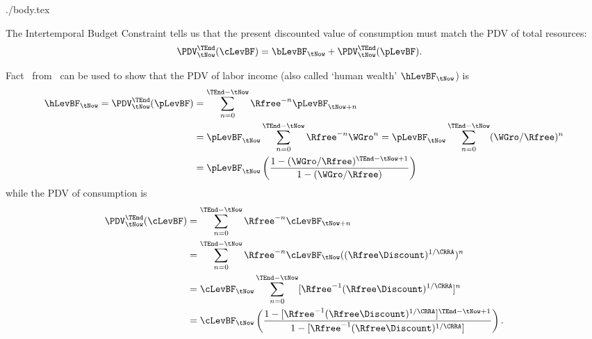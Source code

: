 \documentclass{handout}
\begin{document}
\begin{verbatimwrite}{./body.tex}

The Intertemporal Budget Constraint tells us that the present discounted 
value of consumption must match the PDV of total resources:
\begin{equation}\begin{gathered}\begin{aligned}
        \PDV_{\tNow}^{\TEnd}(\cLevBF) & =  \bLevBF_{\tNow}+\PDV_{\tNow}^{\TEnd}(\pLevBF).
        \label{eq:ibc}
\end{aligned}\end{gathered}\end{equation}

Fact \FinSum~from \MathFactsList~can be used to show that the PDV of labor income (also called `human wealth'
$\hLevBF_{\tNow}$) is
\begin{equation}\begin{gathered}\begin{aligned}
        \hLevBF_{\tNow} = \PDV_{\tNow}^{\TEnd}(\pLevBF) & =  \sum_{n=0}^{\TEnd-\tNow} \Rfree^{-n}\pLevBF_{\tNow+n}
\\       & =  \pLevBF_{\tNow}\sum_{n=0}^{\TEnd-\tNow} \Rfree^{-n}{\WGro}^{n} = \pLevBF_{\tNow}\sum_{n=0}^{\TEnd-\tNow} ({\WGro}/\Rfree)^{n}
\\   & =  \pLevBF_{\tNow}\left(\frac{1-({\WGro}/\Rfree)^{\TEnd-\tNow+1}}{1-({\WGro}/\Rfree)}\right)    \label{eq:yfin}
\end{aligned}\end{gathered}\end{equation}
while the PDV of consumption is
\begin{equation}\begin{gathered}\begin{aligned}
        \PDV_{\tNow}^{\TEnd}(\cLevBF) & =  \sum_{n=0}^{\TEnd-\tNow} \Rfree^{-n}\cLevBF_{\tNow+n}
\\       & =  \sum_{n=0}^{\TEnd-\tNow} \Rfree^{-n}\cLevBF_{\tNow}((\Rfree\Discount)^{1/\CRRA})^{n}
\\       & =  \cLevBF_{\tNow} \sum_{n=0}^{\TEnd-\tNow} [\Rfree^{-1}(\Rfree\Discount)^{1/\CRRA}]^{n}
\\   & =  \cLevBF_{\tNow}\left(\frac{1-[\Rfree^{-1}(\Rfree\Discount)^{1/\CRRA}]^{\TEnd-\tNow+1}}{1-[\Rfree^{-1}(\Rfree\Discount)^{1/\CRRA}]}\right) \label{eq:cfin}.
\end{aligned}\end{gathered}\end{equation}


\end{verbatimwrite}
\end{document}
